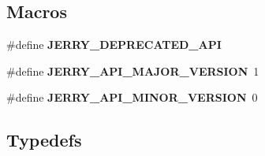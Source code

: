 \subsection*{Macros}
\begin{DoxyCompactItemize}
\item 
\#define \textbf{ J\+E\+R\+R\+Y\+\_\+\+D\+E\+P\+R\+E\+C\+A\+T\+E\+D\+\_\+\+A\+PI}
\item 
\#define \textbf{ J\+E\+R\+R\+Y\+\_\+\+A\+P\+I\+\_\+\+M\+A\+J\+O\+R\+\_\+\+V\+E\+R\+S\+I\+ON}~1
\item 
\#define \textbf{ J\+E\+R\+R\+Y\+\_\+\+A\+P\+I\+\_\+\+M\+I\+N\+O\+R\+\_\+\+V\+E\+R\+S\+I\+ON}~0
\end{DoxyCompactItemize}
\subsection*{Typedefs}
